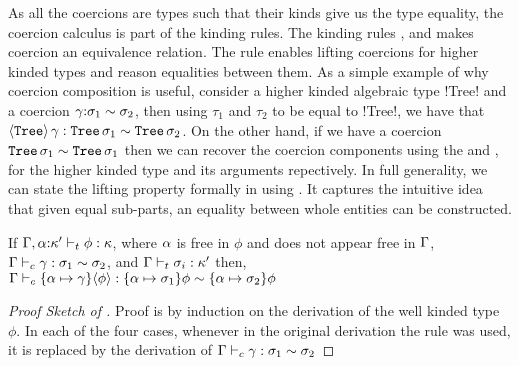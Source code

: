 \documentclass[manuscript,screen,nonacm]{acmart}
\begin{document}
As all the coercions are types such that their kinds give us the type equality, the coercion calculus is part of the kinding rules. The kinding rules ,   and  makes coercion an equivalence relation. The rule  enables lifting coercions for higher kinded types and reason equalities between them. As a simple example of why coercion composition is useful, consider a higher kinded algebraic type !Tree! and a coercion $\gamma{:}\sigma_1\sim\sigma_2$, then using $\tau_1$ and $\tau_2$ to be equal to !Tree!, we have that $\langle\texttt{Tree}\rangle \,\gamma : \texttt{Tree}\,\sigma_1 \sim \texttt{Tree}\,\sigma_2$.
On the other hand, if we have a coercion $\texttt{Tree}\,\sigma_1 \sim \texttt{Tree}\,\sigma_1$ then we can recover the coercion components using the  and , for the higher kinded type and its arguments repectively. In full generality, we can state the lifting property formally in \SFC using .
It captures the intuitive idea that given equal sub-parts, an equality between whole entities can be constructed.
\begin{theorem}\label{thm:sfc-coercion-lifting}
  If $\Gamma,\alpha{:}\kappa' \vdash_{t} \phi : \kappa$, where $\alpha$ is free in $\phi$
  and does not appear free in $\Gamma$,
  $\Gamma \vdash_{c} \gamma : \sigma_1\sim\sigma_2$, and $\Gamma \vdash_{t} \sigma_i : \kappa'$
  then, $\Gamma \vdash_{c} \{\alpha\mapsto \gamma\}\langle\phi\rangle : \{\alpha\mapsto\sigma_1\}\phi \sim \{\alpha\mapsto\sigma_2\}\phi$
\end{theorem}
\begin{proof}[Proof Sketch of ]
  Proof is by induction on the derivation of the well kinded type $\phi$. In each of the four cases, whenever in the original derivation the rule  was used, it is replaced by the derivation of $\Gamma \vdash_{c} \gamma : \sigma_1 \sim \sigma_2$ %
\end{proof}
\end{document}
